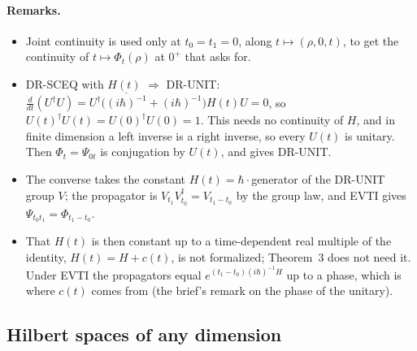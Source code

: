 \documentclass[11pt]{article}
\begin{document}
\paragraph{Remarks.}
\begin{itemize}
\item Joint continuity is used only at $t_0 = t_1 = 0$, along $t \mapsto (\rho, 0, t)$, to get
  the continuity of $t \mapsto \Phi_t(\rho)$ at $0^+$ that  asks for.
\item DR-SCEQ with $H(t)$ $\Rightarrow$ DR-UNIT: $\frac{d}{dt}(U^\dagger U) = U^\dagger
  \bigl(\overline{(i\hbar)^{-1}} + (i\hbar)^{-1}\bigr) H(t) U = 0$, so $U(t)^\dagger U(t) =
  U(0)^\dagger U(0) = 1$. This needs no continuity of $H$, and in finite dimension a left inverse
  is a right inverse, so every $U(t)$ is unitary. Then $\Phi_t = \Psi_{0t}$ is conjugation by
  $U(t)$, and  gives DR-UNIT.
\item The converse takes the constant $H(t) = \hbar\cdot$generator of the DR-UNIT group $V$; the
  propagator is $V_{t_1}V_{t_0}^\dagger = V_{t_1 - t_0}$ by the group law, and EVTI gives
  $\Psi_{t_0 t_1} = \Phi_{t_1 - t_0}$.
\item That $H(t)$ is then constant up to a time-dependent real multiple of the identity,
  $H(t) = H + c(t)$, is not formalized; Theorem~3 does not need it. Under EVTI the propagators
  equal $e^{(t_1 - t_0)(i\hbar)^{-1}H}$ up to a phase, which is where $c(t)$ comes from (the
  brief's remark on the phase of the unitary).
\end{itemize}

\subsection{Hilbert spaces of any dimension}\label{sec:schroedinger-evolution-any-dim}
\end{document}
